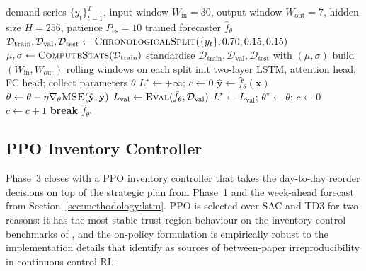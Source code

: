 \documentclass[review,preprint,authoryear,12pt]{elsarticle}
\begin{document}
\begin{algorithm}[H]
\caption{Attention-LSTM training pipeline with leak-free temporal split}
\label{alg:lstm}
\begin{algorithmic}[1]
\Require demand series $\{y_t\}_{t=1}^{T}$, input window $W_{\text{in}}=30$, output window $W_{\text{out}}=7$, hidden size $H=256$, patience $P_{\text{es}}=10$
\Ensure trained forecaster $\hat{f}_\theta$
\State $\mathcal{D}_{\text{train}}, \mathcal{D}_{\text{val}}, \mathcal{D}_{\text{test}} \gets \textsc{ChronologicalSplit}(\{y_t\}, 0.70, 0.15, 0.15)$ 
\State $\mu, \sigma \gets \textsc{ComputeStats}(\mathcal{D}_{\text{train}})$ 
\State standardise $\mathcal{D}_{\text{train}}, \mathcal{D}_{\text{val}}, \mathcal{D}_{\text{test}}$ with $(\mu, \sigma)$
\State build $(W_{\text{in}}, W_{\text{out}})$ rolling windows on each split
\State init two-layer LSTM, attention head, FC head; collect parameters $\theta$
\State $L^\star \gets +\infty$; $c \gets 0$
    \State $\hat{\mathbf{y}} \gets \hat{f}_\theta(\mathbf{x})$
    \State $\theta \gets \theta - \eta \nabla_\theta \textsc{MSE}(\hat{\mathbf{y}}, \mathbf{y})$
  \EndFor
  \State $L_{\text{val}} \gets \textsc{Eval}(\hat{f}_\theta, \mathcal{D}_{\text{val}})$
    \State $L^\star \gets L_{\text{val}}$; $\theta^\star \gets \theta$; $c \gets 0$
  \Else
    \State $c \gets c + 1$
     \textbf{break} 
    \EndIf
  \EndIf
\EndFor
\State \Return $\hat{f}_{\theta^\star}$
\end{algorithmic}
\end{algorithm}

\subsection{PPO Inventory Controller}
\label{sec:methodology:ppo}

Phase~3 closes with a PPO inventory controller that takes the
day-to-day reorder decisions on top of the strategic plan from
Phase~1 and the week-ahead forecast from
Section~\ref{sec:methodology:lstm}. PPO \citep{schulman2017ppo} is
selected over SAC and TD3 for two reasons: it has the most stable
trust-region behaviour on the inventory-control benchmarks of
\citet{gijsbrechts2022drl_inventory}, and the on-policy formulation
is empirically robust to the implementation details that
\citet{andrychowicz2021what} identify as sources of between-paper
irreproducibility in continuous-control RL.
\end{document}
